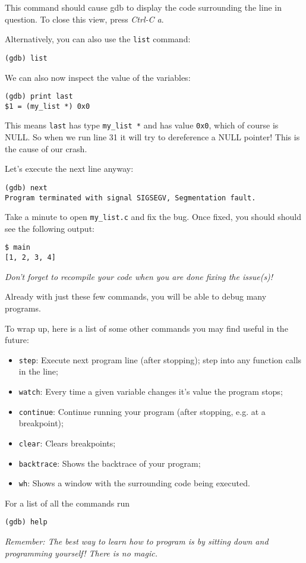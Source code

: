 \documentclass[11pt]{article}
\begin{document}
This command should cause gdb to display the code surrounding the line
in question. To close this view, press \textit{Ctrl-C a}.

\clearpage

Alternatively, you can also use the {\tt list} command:
\begin{verbatim}
(gdb) list
\end{verbatim}

We can also now inspect the value of the variables:

\begin{verbatim}
(gdb) print last
$1 = (my_list *) 0x0
\end{verbatim}

This means {\tt last} has type {\tt my_list *} and has value {\tt 0x0},
which of course is NULL. So when we run line 31 it will try to dereference
a NULL pointer! This is the cause of our crash.

Let's execute the next line anyway:

\begin{verbatim}
(gdb) next
Program terminated with signal SIGSEGV, Segmentation fault.
\end{verbatim}

Take a minute to open {\tt my_list.c} and fix the bug.  Once fixed,
you should should see the following output:

\begin{verbatim}
$ main
[1, 2, 3, 4]
\end{verbatim}

\textit{Don't forget to recompile your code when you are done fixing
the issue(s)!}

Already with just these few commands, you will be able to debug many
programs.

To wrap up, here is a list of some other commands you may find useful
in the future:

\begin{itemize}[noitemsep]
  \item {\tt step}: Execute next program line (after stopping); step into any
function calls in the line;
  \item {\tt watch}: Every time a given variable changes it's value the program stops;
  \item {\tt continue}: Continue running your program (after stopping, e.g. at a breakpoint);
  \item {\tt clear}: Clears breakpoints;
  \item {\tt backtrace}:  Shows the backtrace of your program;
  \item {\tt wh}:  Shows a window with the surrounding code being executed.
\end{itemize}

For a list of all the commands run
\begin{verbatim}
(gdb) help
\end{verbatim}

\textit{Remember: The best way to learn how to program is by sitting down and
programming yourself! There is no magic.}
\end{document}
